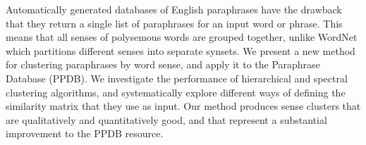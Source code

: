 Automatically generated databases of English paraphrases have the drawback that they return a single list of paraphrases for an input word or phrase. This means that all senses of polysemous words are grouped together, unlike WordNet which partitions different senses into separate synsets. We present a new method for clustering paraphrases by word sense, and apply it to the Paraphrase Database (PPDB). We investigate the performance of hierarchical and spectral clustering algorithms, and systematically explore different ways of defining the similarity matrix that they use as input. Our method produces sense clusters that are qualitatively and quantitatively good, and that represent a substantial improvement to the PPDB resource.

